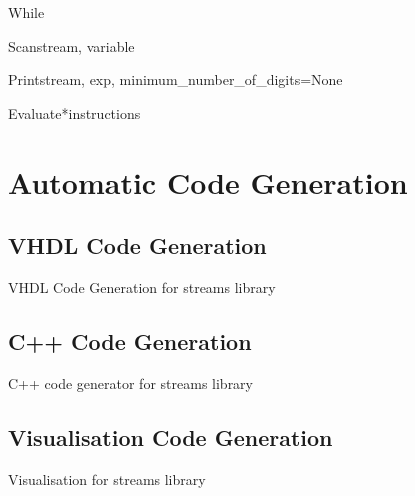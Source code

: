 \documentclass[letterpaper,10pt,english]{manual}
\begin{document}
\hypertarget{chips.While}{}\begin{classdesc}{While}{}\end{classdesc}

\hypertarget{chips.Scan}{}\begin{classdesc}{Scan}{stream, variable}\end{classdesc}

\hypertarget{chips.Print}{}\begin{classdesc}{Print}{stream, exp, minimum\_number\_of\_digits=None}\end{classdesc}

\hypertarget{chips.Evaluate}{}\begin{classdesc}{Evaluate}{*instructions}\end{classdesc}

\resetcurrentobjects
\hypertarget{--doc-automatic\_code\_generation/index}{}

\chapter{Automatic Code Generation}


\section{VHDL Code Generation}
\hypertarget{module-chips.VHDL\_plugin}{}
\modulesynopsis{}
VHDL Code Generation for streams library


\section{C++ Code Generation}
\hypertarget{module-chips.cpp\_plugin}{}
\modulesynopsis{}
C++ code generator for streams library


\section{Visualisation Code Generation}
\hypertarget{module-chips.visual\_plugin}{}
\modulesynopsis{}
Visualisation for streams library

\resetcurrentobjects
\hypertarget{--doc-ip\_library/index}{}
\end{document}

